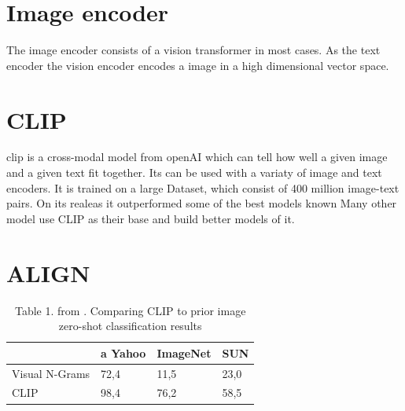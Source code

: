     \section{Image encoder}
    The image encoder consists of a vision transformer\cite{Vis_N_Grams} in most cases.
    As the text encoder the vision encoder encodes a image in a high dimensional vector space.



    \section{CLIP
        \label{section:clip}}
    \acrfull{clip} \cite{clip} is a cross-modal model from openAI\cite{openai} which can tell how well a given image and a given text fit together.
    Its can be used with a variaty of image and text encoders.
    It is trained on a large Dataset, which consist of 400 million image-text pairs.
    On its realeas it outperformed some of the best models known 
    Many other model use CLIP as their base and build better models of it.




    \section{ALIGN
        \label{section:align}}

    \begin{table}
        \begin{tabular}{llll}
            \hline
        &  a Yahoo& ImageNet& SUN \\\hline
        Visual N-Grams&  72,4&  11,5&  23,0\\
        CLIP&  98,4&  76,2&58,5\\ \hline
        \end{tabular}
        \caption{Table 1. from \cite{clip}. Comparing CLIP to prior image zero-shot classification results\cite{Vis_N_Grams}}
    \end{table}